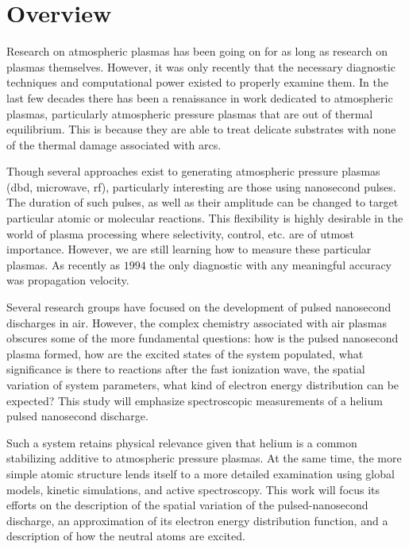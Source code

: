 \section{Overview}

Research on atmospheric plasmas has been going on for as long as research on
plasmas themselves. However, it was only recently that the necessary diagnostic
techniques and computational power existed to properly examine them. In the last
few decades there has been a renaissance in work dedicated to atmospheric
plasmas, particularly atmospheric pressure plasmas that are out of thermal
equilibrium. This is because they are able to treat delicate substrates with
none of the thermal damage associated with arcs.

Though several approaches exist to generating atmospheric pressure plasmas (dbd,
microwave, rf), particularly interesting are those using nanosecond pulses. The
duration of such pulses, as well as their amplitude can be changed to target
particular atomic or molecular reactions. This flexibility is highly desirable
in the world of plasma processing where selectivity, control, etc. are of utmost
importance. However, we are still learning how to measure these particular
plasmas. As recently as $1994$  the only diagnostic with any
meaningful accuracy was propagation velocity. 

Several research groups have focused on the development of pulsed nanosecond
discharges in air. However, the complex chemistry associated with air plasmas
obscures some of the more fundamental questions: how is the pulsed nanosecond
plasma formed, how are the excited states of the system populated, what
significance is there to reactions after the fast ionization wave, the spatial
variation of system parameters, what kind of electron energy distribution can be
expected?  This study will emphasize
spectroscopic measurements of a helium pulsed nanosecond discharge.

Such a system retains physical relevance given that helium is a common
stabilizing additive to atmospheric pressure plasmas. At the same time, the more
simple atomic structure lends itself to a more detailed examination using global
models, kinetic simulations, and active spectroscopy. This work will focus its
efforts on the description of the spatial variation of the pulsed-nanosecond
discharge, an approximation of its electron energy distribution function, and a
description of how the neutral atoms are excited.

